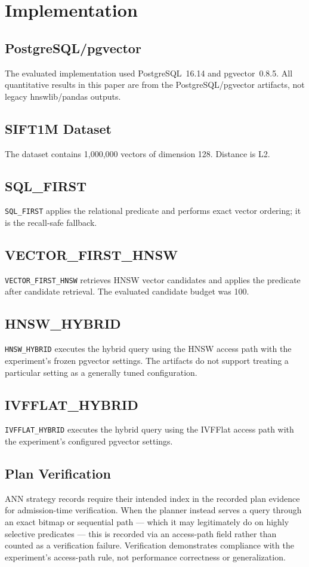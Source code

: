 \documentclass[conference]{IEEEtran}
\begin{document}
\section{Implementation}
\subsection{PostgreSQL/pgvector}
The evaluated implementation used PostgreSQL~16.14 and pgvector~0.8.5. All quantitative results in this paper are from the PostgreSQL/pgvector artifacts, not legacy hnswlib/pandas outputs.

\subsection{SIFT1M Dataset}
The dataset contains 1,000,000 vectors of dimension 128. Distance is L2.

\subsection{SQL\_FIRST}
\texttt{SQL\_FIRST} applies the relational predicate and performs exact vector ordering; it is the recall-safe fallback.

\subsection{VECTOR\_FIRST\_HNSW}
\texttt{VECTOR\_FIRST\_HNSW} retrieves HNSW vector candidates and applies the predicate after candidate retrieval. The evaluated candidate budget was 100.

\subsection{HNSW\_HYBRID}
\texttt{HNSW\_HYBRID} executes the hybrid query using the HNSW access path with the experiment's frozen pgvector settings. The artifacts do not support treating a particular setting as a generally tuned configuration.

\subsection{IVFFLAT\_HYBRID}
\texttt{IVFFLAT\_HYBRID} executes the hybrid query using the IVFFlat access path with the experiment's configured pgvector settings.

\subsection{Plan Verification}
ANN strategy records require their intended index in the recorded plan evidence for admission-time verification. When the planner instead serves a query through an exact bitmap or sequential path --- which it may legitimately do on highly selective predicates --- this is recorded via an access-path field rather than counted as a verification failure. Verification demonstrates compliance with the experiment's access-path rule, not performance correctness or generalization.
\end{document}

